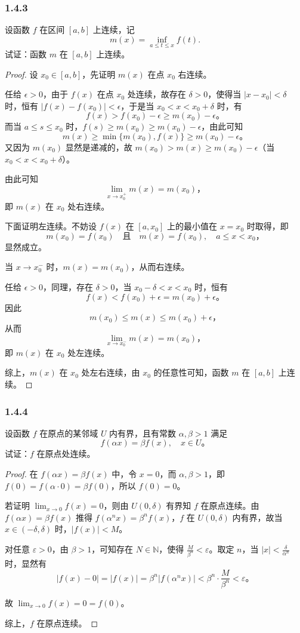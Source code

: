 \documentclass[12pt]{ctexart}
\begin{document}
\subsubsection*{1.4.3}
设函数 $f$ 在区间 $[a,b]$ 上连续，记
\[
m(x) = \inf_{a \leq t \leq x} f(t).
\]
试证：函数 $m$ 在 $[a,b]$ 上连续。

\begin{proof}
设 $x_0 \in [a, b]$，先证明 $m(x)$ 在点 $x_0$ 右连续。

任给 $\epsilon > 0$，由于 $f(x)$ 在点 $x_0$ 处连续，故存在 $\delta > 0$，使得当 $|x - x_0| < \delta$ 时，恒有 $|f(x) - f(x_0)| < \epsilon$，于是当 $x_0 < x < x_0 + \delta$ 时，有
\[
f(x) > f(x_0) - \epsilon \geq m(x_0) - \epsilon。
\]
而当 $a \leq s \leq x_0$ 时，$f(s) \geq m(x_0) \geq m(x_0) - \epsilon$，由此可知
\[
m(x) \geq \min\{m(x_0), f(x)\} \geq m(x_0) - \epsilon。
\]
又因为 $m(x_0)$ 显然是递减的，故 $m(x_0) > m(x) \geq m(x_0) - \epsilon$（当 $x_0 < x < x_0 + \delta$）。

由此可知
\[
\lim_{x \to x_0^+} m(x) = m(x_0)，
\]
即 $m(x)$ 在 $x_0$ 处右连续。

下面证明左连续。不妨设 $f(x)$ 在 $[a, x_0]$ 上的最小值在 $x = x_0$ 时取得，即
\[
m(x_0) = f(x_0) \quad \text{且} \quad m(x) = f(x_0), \quad a \leq x < x_0，
\]
显然成立。

当 $x \to x_0^-$ 时，$m(x) = m(x_0)$，从而右连续。

任给 $\epsilon > 0$，同理，存在 $\delta > 0$，当 $x_0 - \delta < x < x_0$ 时，恒有
\[
f(x) < f(x_0) + \epsilon = m(x_0) + \epsilon。
\]
因此
\[
m(x_0) \leq m(x) \leq m(x_0) + \epsilon，
\]
从而
\[
\lim_{x \to x_0^-} m(x) = m(x_0)，
\]
即 $m(x)$ 在 $x_0$ 处左连续。

综上，$m(x)$ 在 $x_0$ 处左右连续，由 $x_0$ 的任意性可知，函数 $m$ 在 $[a, b]$ 上连续。
\end{proof}

\subsubsection*{1.4.4}
设函数 $f$ 在原点的某邻域 $U$ 内有界，且有常数 $\alpha, \beta > 1$ 满足
\[
f(\alpha x) = \beta f(x), \quad x \in U。
\]
试证：$f$ 在原点处连续。

\begin{proof}
在 $f(\alpha x) = \beta f(x)$ 中，令 $x = 0$，而 $\alpha, \beta > 1$，即 $f(0) = f(\alpha \cdot 0) = \beta f(0)$，所以 $f(0) = 0$。

若证明 $\lim_{x \to 0} f(x) = 0$，则由 $U(0, \delta)$ 有界知 $f$ 在原点连续。由 $f(\alpha x) = \beta f(x)$ 推得 $f(\alpha^n x) = \beta^n f(x)$，$f$ 在 $U(0, \delta)$ 内有界，故当 $x \in (-\delta, \delta)$ 时，$\lvert f(x) \rvert < M$。

对任意 $\varepsilon > 0$，由 $\beta > 1$，可知存在 $N \in \mathbb{N}$，使得 $\frac{M}{\beta^n} < \varepsilon$。取定 $n$，当 $\lvert x \rvert < \frac{\delta}{\alpha^n}$ 时，显然有
\[
\lvert f(x) - 0 \rvert = \lvert f(x) \rvert = \beta^n \lvert f(\alpha^n x) \rvert < \beta^n \cdot \frac{M}{\beta^n} < \varepsilon。
\]

故 $\lim_{x \to 0} f(x) = 0 = f(0)$。

综上，$f$ 在原点连续。
\end{proof}
\end{document}
